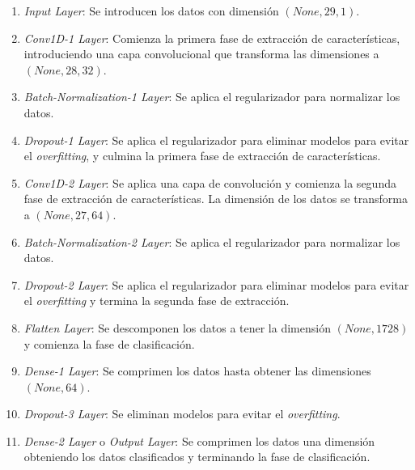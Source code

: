   \begin{enumerate}
  	\item \textit{Input Layer}: Se introducen los datos con dimensi\'{o}n $(None, 29, 1)$.
  	\item \textit{Conv1D-1 Layer}: Comienza la primera fase de extracci\'{o}n de caracter\'{i}sticas, introduciendo una capa convolucional que transforma las dimensiones a $(None, 28, 32)$.
  	\item \textit{Batch-Normalization-1 Layer}: Se aplica el regularizador para normalizar los datos.
  	\item \textit{Dropout-1 Layer}: Se aplica el regularizador para eliminar modelos para evitar el \textit{overfitting}, y culmina la primera fase de extracci\'{o}n de caracter\'{i}sticas.
  	\item \textit{Conv1D-2 Layer}: Se aplica una capa de convoluci\'{o}n y comienza la segunda fase de extracci\'{o}n de caracter\'{i}sticas. La dimensi\'{o}n de los datos se transforma a $(None, 27, 64)$.
  	\item \textit{Batch-Normalization-2 Layer}: Se aplica el regularizador para normalizar los datos.
  	\item \textit{Dropout-2 Layer}: Se aplica el regularizador para eliminar modelos para evitar el \textit{overfitting} y termina la segunda fase de extracci\'{o}n.
  	\item \textit{Flatten Layer}: Se descomponen los datos a tener la dimensi\'{o}n $(None, 1728)$ y comienza la fase de clasificaci\'{o}n.
  	\item \textit{Dense-1 Layer}: Se comprimen los datos hasta obtener las dimensiones $(None, 64)$.
  	\item \textit{Dropout-3 Layer}: Se eliminan modelos para evitar el \textit{overfitting}.
  	\item \textit{Dense-2 Layer} o \textit{Output Layer}: Se comprimen los datos una dimensi\'{o}n obteniendo los datos clasificados y terminando la fase de clasificaci\'{o}n.
  \end{enumerate}

